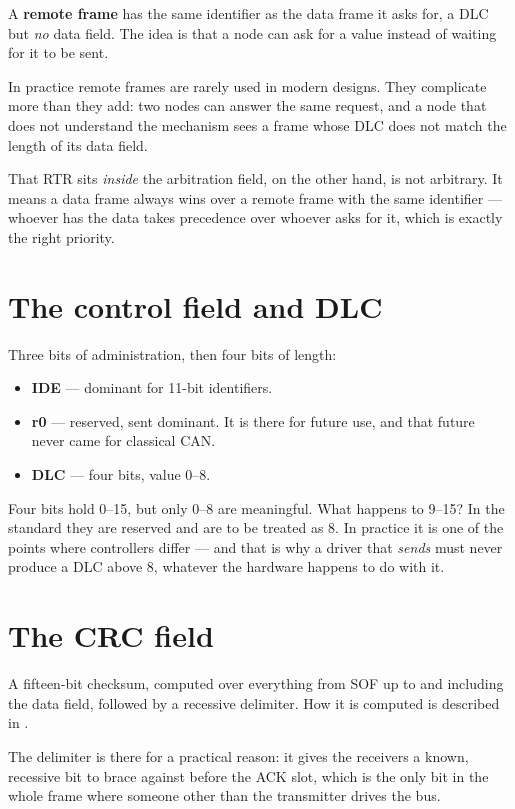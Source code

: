 A \textbf{remote frame} has the same identifier as the data frame it asks for, a DLC but \emph{no}
data field. The idea is that a node can ask for a value instead of waiting for it to be sent.

In practice remote frames are rarely used in modern designs. They complicate more than they add:
two nodes can answer the same request, and a node that does not understand the mechanism sees a
frame whose DLC does not match the length of its data field.

That RTR sits \emph{inside} the arbitration field, on the other hand, is not arbitrary. It means a
data frame always wins over a remote frame with the same identifier --- whoever has the data takes
precedence over whoever asks for it, which is exactly the right priority.

\section{The control field and DLC}

Three bits of administration, then four bits of length:

\begin{itemize}
  \item \textbf{IDE} --- dominant for 11-bit identifiers.
  \item \textbf{r0} --- reserved, sent dominant. It is there for future use, and that future never
    came for classical CAN.
  \item \textbf{DLC} --- four bits, value 0--8.
\end{itemize}

Four bits hold 0--15, but only 0--8 are meaningful. What happens to 9--15? In the standard they are
reserved and are to be treated as 8. In practice it is one of the points where controllers differ
--- and that is why a driver that \emph{sends} must never produce a DLC above 8, whatever the
hardware happens to do with it.

\section{The CRC field}

A fifteen-bit checksum, computed over everything from SOF up to and including the data field,
followed by a recessive delimiter. How it is computed is described in .

The delimiter is there for a practical reason: it gives the receivers a known, recessive bit to
brace against before the ACK slot, which is the only bit in the whole frame where someone other
than the transmitter drives the bus.

